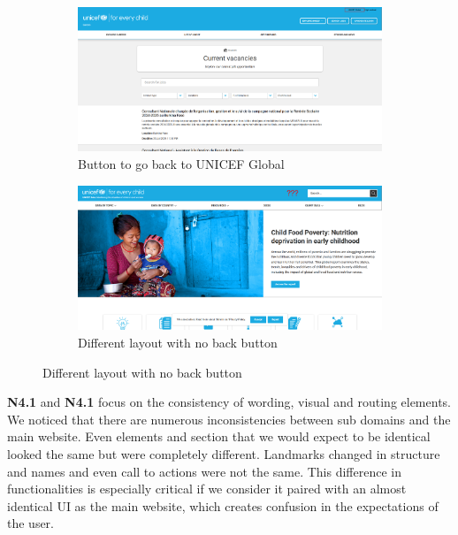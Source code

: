 \begin{figure}[h]
    \centering
	\begin{subfigure}[b]{0.48\textwidth}
        \centering
        \includegraphics[width=\textwidth]{img/critical_heuristics/N3.2a.png}
        \caption{Button to go back to UNICEF Global}
        \label{fig:N3.2a}
    \end{subfigure}
    \hfill
    \begin{subfigure}[b]{0.48\textwidth}
        \centering
        \includegraphics[width=\textwidth]{img/critical_heuristics/N3.2b.png}
        \caption{Different layout with no back button}
        \label{fig:N3.2b}
    \end{subfigure}
\end{figure}

\textbf{N4.1} and \textbf{N4.1} focus on the consistency of wording, visual and routing elements. We noticed that there are numerous inconsistencies between sub domains and the main website. Even elements and section that we would expect
to be identical looked the same but were completely different. Landmarks changed in structure and names and even call to actions were not the same. This difference in functionalities is especially critical if we consider it
paired with an almost identical UI as the main website, which creates confusion in the expectations of the user.

